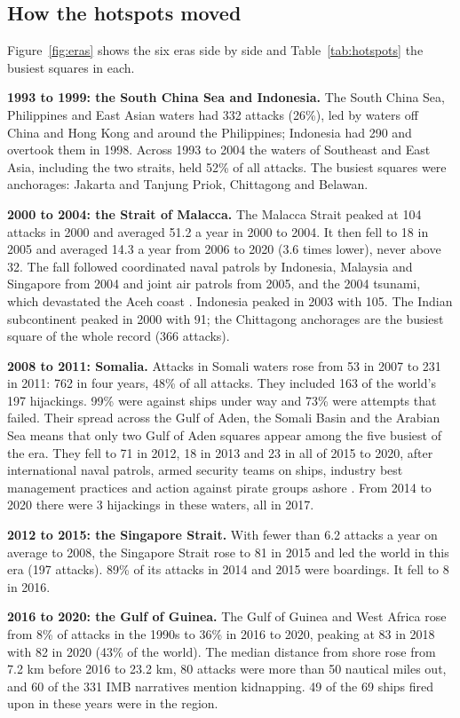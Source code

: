 \documentclass[11pt,a4paper]{article}
\begin{document}
\subsection{How the hotspots moved}
Figure~\ref{fig:eras} shows the six eras side by side and Table~\ref{tab:hotspots} the busiest squares in each.

\textbf{1993 to 1999: the South China Sea and Indonesia.} The South China Sea, Philippines and East Asian waters had 332 attacks (26\%), led by waters off China and Hong Kong and around the Philippines; Indonesia had 290 and overtook them in 1998. Across 1993 to 2004 the waters of Southeast and East Asia, including the two straits, held 52\% of all attacks. The busiest squares were anchorages: Jakarta and Tanjung Priok, Chittagong and Belawan.

\textbf{2000 to 2004: the Strait of Malacca.} The Malacca Strait peaked at 104 attacks in 2000 and averaged 51.2 a year in 2000 to 2004. It then fell to 18 in 2005 and averaged 14.3 a year from 2006 to 2020 (3.6 times lower), never above 32. The fall followed coordinated naval patrols by Indonesia, Malaysia and Singapore from 2004 and joint air patrols from 2005, and the 2004 tsunami, which devastated the Aceh coast \citep{liss}. Indonesia peaked in 2003 with 105. The Indian subcontinent peaked in 2000 with 91; the Chittagong anchorages are the busiest square of the whole record (366 attacks).

\textbf{2008 to 2011: Somalia.} Attacks in Somali waters rose from 53 in 2007 to 231 in 2011: 762 in four years, 48\% of all attacks. They included 163 of the world's 197 hijackings. 99\% were against ships under way and 73\% were attempts that failed. Their spread across the Gulf of Aden, the Somali Basin and the Arabian Sea means that only two Gulf of Aden squares appear among the five busiest of the era. They fell to 71 in 2012, 18 in 2013 and 23 in all of 2015 to 2020, after international naval patrols, armed security teams on ships, industry best management practices and action against pirate groups ashore \citep{worldbank,bueger,shortland}. From 2014 to 2020 there were 3 hijackings in these waters, all in 2017.

\textbf{2012 to 2015: the Singapore Strait.} With fewer than 6.2 attacks a year on average to 2008, the Singapore Strait rose to 81 in 2015 and led the world in this era (197 attacks). 89\% of its attacks in 2014 and 2015 were boardings. It fell to 8 in 2016.

\textbf{2016 to 2020: the Gulf of Guinea.} The Gulf of Guinea and West Africa rose from 8\% of attacks in the 1990s to 36\% in 2016 to 2020, peaking at 83 in 2018 with 82 in 2020 (43\% of the world). The median distance from shore rose from 7.2 km before 2016 to 23.2 km, 80 attacks were more than 50 nautical miles out, and 60 of the 331 IMB narratives mention kidnapping. 49 of the 69 ships fired upon in these years were in the region.
\end{document}
